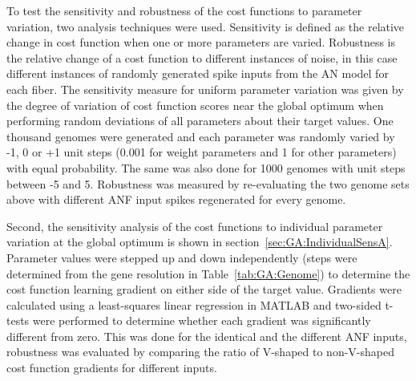 \smallskip{}

To test the sensitivity and robustness of the cost functions to
parameter variation, two analysis techniques were used. Sensitivity is
defined as the relative change in cost function when one or more
parameters are varied.  Robustness is the relative change of a cost
function to different instances of noise, in this case different
instances of randomly generated spike inputs from the AN model for
each fiber.  The sensitivity measure for uniform parameter variation
was given by the degree of variation of cost function scores near the
global optimum when performing random deviations of all parameters
about their target values. One thousand genomes were generated and
each parameter was randomly varied by -1, 0 or +1 unit steps (0.001
for weight parameters and 1 for other parameters) with equal
probability. The same was also done for 1000 genomes with unit steps
between -5 and 5.  Robustness was measured by re-evaluating the two
genome sets above with different ANF input spikes regenerated for
every genome.

\smallskip{}

Second, the sensitivity analysis of the cost functions to individual
parameter variation at the global optimum is shown in
section~\ref{sec:GA:IndividualSensA}. Parameter values were stepped up
and down independently (steps were determined from the gene resolution
in Table~\ref{tab:GA:Genome}) to determine the cost function learning
gradient on either side of the target value. Gradients were calculated
using a least-squares linear regression in MATLAB and two-sided
t-tests were performed to determine whether each gradient was
significantly different from zero.  This was done for the identical
and the different ANF inputs, robustness was evaluated by comparing
the ratio of V-shaped to non-V-shaped cost function gradients for
different inputs.






